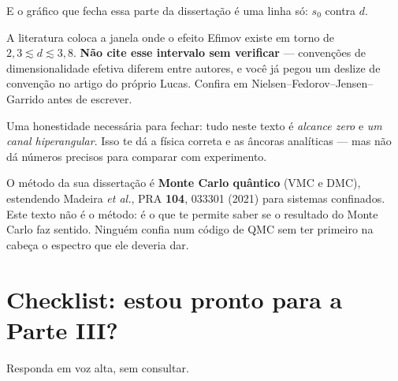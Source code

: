 \documentclass[11pt,a4paper]{article}
\begin{document}
E o gráfico que fecha essa parte da dissertação é uma linha só: $s_{0}$ contra $d$.

\begin{atencao}
A literatura coloca a janela onde o efeito Efimov existe em torno de
$2{,}3 \lesssim d \lesssim 3{,}8$. \textbf{Não cite esse intervalo sem verificar} ---
convenções de dimensionalidade efetiva diferem entre autores, e você já pegou um
deslize de convenção no artigo do próprio Lucas. Confira em
Nielsen--Fedorov--Jensen--Garrido antes de escrever.
\end{atencao}

\begin{ponte}
Uma honestidade necessária para fechar: tudo neste texto é \emph{alcance zero} e
\emph{um canal hiperangular}. Isso te dá a física correta e as âncoras analíticas ---
mas não dá números precisos para comparar com experimento.

O método da sua dissertação é \textbf{Monte Carlo quântico} (VMC e DMC), estendendo
Madeira \emph{et al.}, PRA \textbf{104}, 033301 (2021) para sistemas confinados. Este
texto não é o método: é o que te permite saber se o resultado do Monte Carlo faz
sentido. Ninguém confia num código de QMC sem ter primeiro na cabeça o espectro que
ele deveria dar.
\end{ponte}

\section*{Checklist: estou pronto para a Parte III?}

Responda em voz alta, sem consultar.
\end{document}
